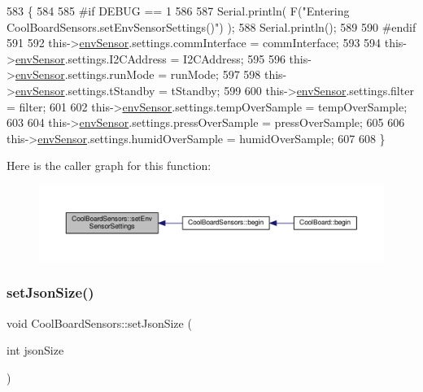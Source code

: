 \begin{DoxyCode}
583 \{
584 
585 \textcolor{preprocessor}{#if DEBUG == 1}
586     
587     Serial.println( F(\textcolor{stringliteral}{"Entering CoolBoardSensors.setEnvSensorSettings()"}) );
588     Serial.println();
589 
590 \textcolor{preprocessor}{#endif}
591   
592     this->\hyperlink{classCoolBoardSensors_a868e38985e9a2412829fa2790ca13e2e}{envSensor}.settings.commInterface = commInterface;      
593 
594     this->\hyperlink{classCoolBoardSensors_a868e38985e9a2412829fa2790ca13e2e}{envSensor}.settings.I2CAddress = I2CAddress;
595 
596     this->\hyperlink{classCoolBoardSensors_a868e38985e9a2412829fa2790ca13e2e}{envSensor}.settings.runMode = runMode; 
597 
598     this->\hyperlink{classCoolBoardSensors_a868e38985e9a2412829fa2790ca13e2e}{envSensor}.settings.tStandby = tStandby; 
599 
600     this->\hyperlink{classCoolBoardSensors_a868e38985e9a2412829fa2790ca13e2e}{envSensor}.settings.filter = filter; 
601 
602     this->\hyperlink{classCoolBoardSensors_a868e38985e9a2412829fa2790ca13e2e}{envSensor}.settings.tempOverSample = tempOverSample;
603 
604     this->\hyperlink{classCoolBoardSensors_a868e38985e9a2412829fa2790ca13e2e}{envSensor}.settings.pressOverSample = pressOverSample;
605 
606     this->\hyperlink{classCoolBoardSensors_a868e38985e9a2412829fa2790ca13e2e}{envSensor}.settings.humidOverSample = humidOverSample;
607 
608 \}
\end{DoxyCode}
Here is the caller graph for this function\+:\nopagebreak
\begin{figure}[H]
\begin{center}
\leavevmode
\includegraphics[width=350pt]{classCoolBoardSensors_a406307ffd70272282d91479c7ed8d66f_icgraph}
\end{center}
\end{figure}
\mbox{\label{classCoolBoardSensors_ab76e6dbd6efbcc25ff460535badd8d45}} 
\subsubsection{\texorpdfstring{set\+Json\+Size()}{setJsonSize()}}
{\footnotesize\ttfamily void Cool\+Board\+Sensors\+::set\+Json\+Size (\begin{DoxyParamCaption}\item[{int}]{json\+Size }\end{DoxyParamCaption})}

